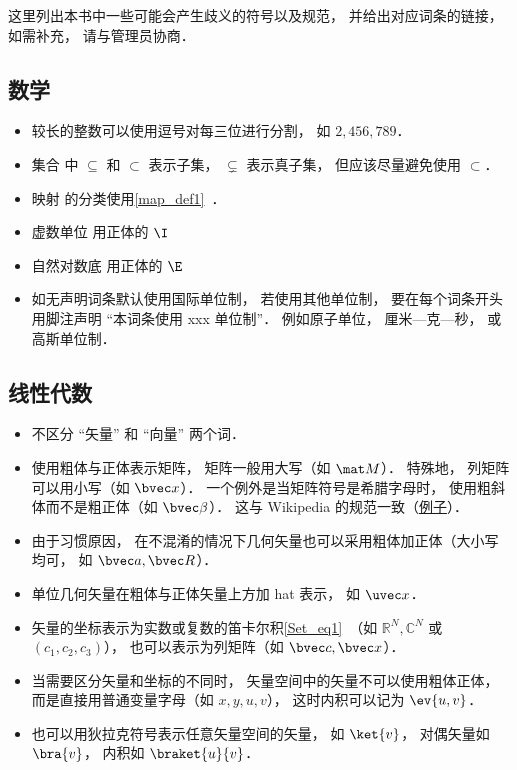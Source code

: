 
这里列出本书中一些可能会产生歧义的符号以及规范， 并给出对应词条的链接， 如需补充， 请与管理员协商．

\subsection{数学}
\begin{itemize}
\item 较长的整数可以使用逗号对每三位进行分割， 如 $2,456,789$．
\item 集合 中 $\subseteq$ 和 $\subset$ 表示子集， $\subsetneq$ 表示真子集， 但应该尽量避免使用 $\subset$．
\item 映射 的分类使用\autoref{map_def1}~．
\item 虚数单位 用正体的 $\I$
\item 自然对数底 用正体的 $\E$
\item 如无声明词条默认使用国际单位制， 若使用其他单位制， 要在每个词条开头用脚注声明 “本词条使用 xxx 单位制”． 例如原子单位， 厘米—克—秒， 或高斯单位制．
\end{itemize}

\subsection{线性代数}
\begin{itemize}
\item 不区分 “矢量” 和 “向量” 两个词．
\item 使用粗体与正体表示矩阵， 矩阵一般用大写（如 $\mat M$）． 特殊地， 列矩阵可以用小写（如 $\bvec x$）． 一个例外是当矩阵符号是希腊字母时， 使用粗斜体而不是粗正体（如 $\bvec \beta$）． 这与 Wikipedia 的规范一致（\href{https://en.wikipedia.org/wiki/Angular_acceleration}{例子}）．
\item 由于习惯原因， 在不混淆的情况下几何矢量也可以采用粗体加正体（大小写均可， 如 $\bvec a, \bvec R$）．
\item 单位几何矢量在粗体与正体矢量上方加 hat 表示， 如 $\uvec x$．
\item 矢量的坐标表示为实数或复数的笛卡尔积\autoref{Set_eq1}~（如 $\mathbb R^N, \mathbb C^N$ 或 $(c_1, c_2, c_3)$）， 也可以表示为列矩阵（如 $\bvec c, \bvec x$）．
\item 当需要区分矢量和坐标的不同时， 矢量空间中的矢量不可以使用粗体正体， 而是直接用普通变量字母（如 $x, y, u, v$）， 这时内积可以记为 $\ev{u, v}$．
\item 也可以用狄拉克符号表示任意矢量空间的矢量， 如 $\ket{v}$， 对偶矢量如 $\bra{v}$， 内积如 $\braket{u}{v}$．
\end{itemize}

